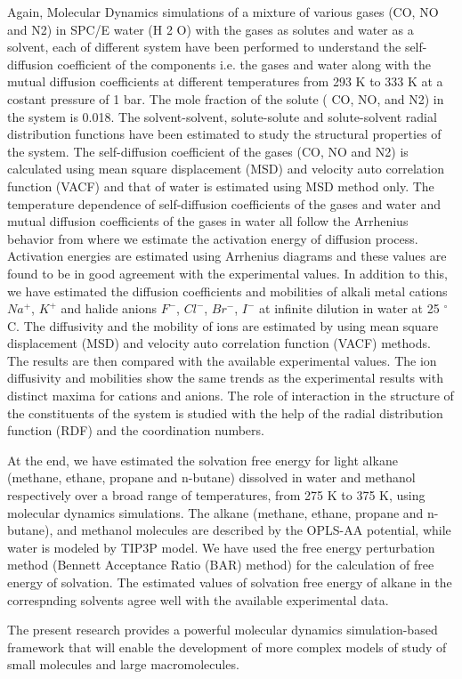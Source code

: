 {{Again,  Molecular Dynamics simulations of a mixture of various gases (CO, NO and N2)
 in SPC/E water (H 2 O) with the gases as solutes  and water as a solvent, each of different system have been performed to understand the self-diffusion coefficient of the components i.e. the gases and water along with the mutual diffusion coefficients at different temperatures from 293 K to 333 K at a costant pressure of 1 bar. The mole fraction of the solute ( CO, NO, and N2) in the
system is  0.018. The solvent-solvent, solute-solute
and solute-solvent radial distribution functions have been estimated to study
the structural properties of the system. The self-diffusion coefficient of the gases (CO, NO and N2) is
calculated using mean square displacement (MSD) and velocity auto correlation
function (VACF) and that of water is estimated using MSD method only. The temperature dependence of self-diffusion coefficients of the gases  and water and mutual diffusion coefficients of the gases in water all follow the Arrhenius behavior from where we estimate the activation energy of diffusion process. Activation energies are estimated using Arrhenius diagrams and
these values are found to be in good agreement with the experimental values. In addition to this, we have estimated  the diffusion coefficients  and mobilities of alkali metal cations $Na^{+}$, $K^{+}$ and halide anions $F^{-}$, $Cl^{-}$, $Br^{-}$, $I^{-}$  at infinite dilution in water at 25 $^{\circ}$C. The diffusivity and the mobility of ions are  estimated  by using mean square displacement (MSD) and  velocity auto correlation function (VACF) methods. The results are then compared with the available experimental values. The ion diffusivity and  mobilities show the same trends as the experimental
 results with distinct maxima for cations and anions. The role of interaction in the structure of the constituents of the system is studied with the help of the radial distribution function (RDF) and the coordination numbers. 
 
At the end, we have estimated the solvation free  energy for light alkane (methane, ethane, propane and n-butane) dissolved in water and methanol  respectively over a broad range of temperatures, from 275 K to 375 K, using molecular dynamics simulations. The alkane (methane, ethane, propane and n-butane), and methanol molecules are  described by the OPLS-AA  potential, while water is modeled by TIP3P  model. We  have used the free energy perturbation method (Bennett Acceptance Ratio (BAR) method) for the  calculation of free energy of solvation. The estimated values of solvation free energy of alkane in  the correspnding solvents agree well with the available experimental data. 


The present research provides a powerful molecular dynamics simulation-based framework that will enable the development of more complex models of study of small molecules and  large macromolecules.}}

